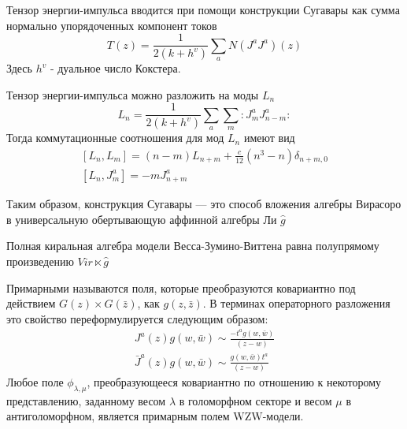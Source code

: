 \documentclass[a4paper,12pt]{article}
\theoremstyle{definition} \newtheorem{Def}{Definition}
\begin{document}
Тензор энергии-импульса вводится при помощи конструкции Сугавары как сумма нормально упорядоченных компонент токов
\begin{equation}
  \label{eq:6}
  T(z)=\frac{1}{2(k+h^v)}\sum_a N(J^a J^a)(z)
\end{equation}
Здесь $h^v$ - дуальное число Кокстера.

Тензор энергии-импульса можно разложить на моды $L_n$
\begin{equation}
  \label{eq:91}
  L_n=\frac{1}{2(k+h^v)}\sum_a\sum_m:J^a_m J^a_{n-m}:
\end{equation}
Тогда коммутационные соотношения для мод  $L_n$ имеют вид
\begin{equation}
  \label{eq:92}
  \begin{aligned}
    \left[L_n,L_m\right]=(n-m)L_{n+m}+\frac{c}{12}(n^3-n)\delta_{n+m,0}\\
    \left[L_n,J^a_m\right]=-mJ^a_{n+m}
  \end{aligned}
\end{equation}

Таким образом, конструкция Сугавары --- это способ вложения алгебры Вирасоро в универсальную обертывающую аффинной алгебры Ли $\hat{g}$

Полная киральная алгебра модели Весса-Зумино-Виттена равна полупрямому произведению $Vir\ltimes \hat g$

Примарными называются поля, которые преобразуются ковариантно под действием $G(z)\times G(\bar z)$, как $g(z,\bar z)$. В терминах операторного разложения это свойство переформулируется следующим образом:
\begin{equation}
  \label{eq:84}
  \begin{aligned}
    J^a(z)g(w,\bar w)\sim \frac{-t^a g(w,\bar w)}{(z-w)}\\
    \bar J^a(z)g(w,\bar w)\sim \frac{ g(w,\bar w)t^a}{(z-w)}
  \end{aligned}
\end{equation}
Любое поле $\phi_{\lambda,\mu}$, преобразующееся ковариантно по отношению к некоторому представлению, заданному весом  $\lambda$ в голоморфном секторе и весом $\mu$ в антиголоморфном, является примарным полем WZW-модели.
\end{document}
